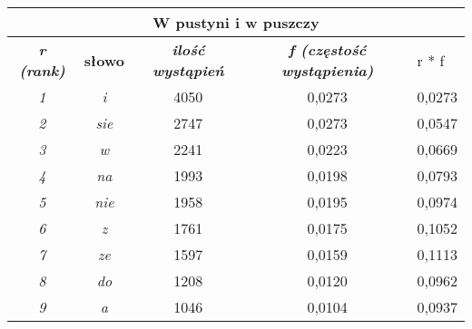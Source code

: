 \documentclass[a4paper]{article}
\begin{document}
\begin{table}
\begin{tabular}{ccc|c|l|}
\hline
\multicolumn{5}{|c|}{\textbf{W pustyni i w puszczy}}                                                                                                                             \\ \hline
\multicolumn{1}{|c|}{\textit{\textbf{r (rank)}}} & \multicolumn{1}{c|}{\textbf{słowo}} & \textit{\textbf{ilość wystąpień}} & \textit{\textbf{f (częstość wystąpienia)}} & r * f  \\ \hline
\multicolumn{1}{|c|}{\textit{1}}                 & \multicolumn{1}{c|}{\textit{i}}     & 4050                              & 0,0273                                     & 0,0273 \\ \hline
\multicolumn{1}{|c|}{\textit{2}}                 & \multicolumn{1}{c|}{\textit{sie}}   & 2747                              & 0,0273                                     & 0,0547 \\ \hline
\multicolumn{1}{|c|}{\textit{3}}                 & \multicolumn{1}{c|}{\textit{w}}     & 2241                              & 0,0223                                     & 0,0669 \\ \hline
\multicolumn{1}{|c|}{\textit{4}}                 & \multicolumn{1}{c|}{\textit{na}}    & 1993                              & 0,0198                                     & 0,0793 \\ \hline
\multicolumn{1}{|c|}{\textit{5}}                 & \multicolumn{1}{c|}{\textit{nie}}   & 1958                              & 0,0195                                     & 0,0974 \\ \hline
\multicolumn{1}{|c|}{\textit{6}}                 & \multicolumn{1}{c|}{\textit{z}}     & 1761                              & 0,0175                                     & 0,1052 \\ \hline
\multicolumn{1}{|c|}{\textit{7}}                 & \multicolumn{1}{c|}{\textit{ze}}    & 1597                              & 0,0159                                     & 0,1113 \\ \hline
\multicolumn{1}{|c|}{\textit{8}}                 & \multicolumn{1}{c|}{\textit{do}}    & 1208                              & 0,0120                                     & 0,0962 \\ \hline
\multicolumn{1}{|c|}{\textit{9}}                 & \multicolumn{1}{c|}{\textit{a}}     & 1046                              & 0,0104                                     & 0,0937 \\ \hline

\end{tabular}
\end{table}
\end{document}
